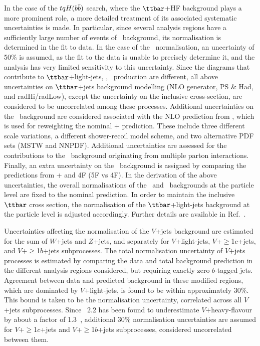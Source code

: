 In the case of the $tqH(b\bar{b})$ search, where the $\ttbar$+HF background plays a more prominent role, a more 
detailed treatment of its associated systematic uncertainties is made. In particular, since several analysis 
regions have a sufficiently large number of events of \ttbin\ background, its normalisation is 
determined in the fit to data.
In the case of the \ttcin\ normalisation, an uncertainty of 50\% is assumed, as the fit to the data is unable 
to precisely determine it, and the analysis has very limited sensitivity to this uncertainty.
Since the diagrams that contribute to $\ttbar$+light-jets, \ttcin, \ttbin\
production are different, all above uncertainties on $\ttbar$+jets
background modelling (NLO generator, PS \& Had, and radHi/radLow), except the uncertainty on the inclusive cross-section, are
considered to be uncorrelated among these processes.
Additional uncertainties on the \ttbin\ background are considered associated with the NLO prediction from {\ShOL}, 
which is used for reweighting the nominal {\powheg}+{\pythiaeight} prediction. 
These include three different scale variations,  a different shower-recoil model scheme, and 
two alternative PDF sets (MSTW and NNPDF). Additional uncertainties are assessed for
the contributions to the \ttbin\ background originating from multiple parton interactions.
Finally, an extra uncertainty on the \ttbin\ background is assigned by comparing 
the predictions from {\powheg}+{\pythiaeight} and {\ShOL} 4F (5F vs 4F).
In the derivation of the above uncertainties, the overall normalisations of the \ttcin\ and \ttbin\ backgrounds 
at the particle level are fixed to the nominal prediction. In order to maintain the inclusive $\ttbar$ cross section, 
the normalisation of the $\ttbar$+light-jets background at the particle level is adjusted accordingly.
Further details are available in Ref.~\cite{Aaboud:2017rss}.

Uncertainties affecting the normalisation of the $V$+jets background are estimated for the sum
of $W$+jets and $Z$+jets, and separately for $V$+light-jets, $V$+$\geq$1$c$+jets, and $V$+$\geq$1$b$+jets subprocesses.
The total normalisation uncertainty of $V$+jets processes is estimated by comparing the data and total background prediction in 
the different analysis regions considered, but requiring exactly zero $b$-tagged jets. Agreement between data and predicted background 
in these modified regions, which are dominated by $V$+light-jets, is found to be within approximately 30\%. This bound is taken to 
be the normalisation uncertainty, correlated across all $V$+jets subprocesses. 
Since {\sherpa}~2.2 has been found to underestimate $V$+heavy-flavour by about a factor
of 1.3~\cite{Aaboud:2017xsd}, additional 30\% normalisation uncertainties are assumed for $V$+$\geq$1$c$+jets and $V$+$\geq$1$b$+jets
subprocesses, considered uncorrelated between them.

